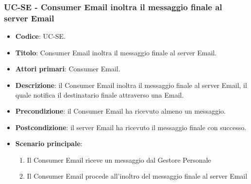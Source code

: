 \subsubsection{UC\theuccount-SE - Consumer Email inoltra il messaggio finale al server Email}
	\begin{itemize}
		\item \textbf{Codice}: UC\theuccount-SE.
		\item \textbf{Titolo}: Consumer Email inoltra il messaggio finale al server Email.
		\item \textbf{Attori primari}: Consumer Email.
		\item \textbf{Descrizione}: il Consumer Email inoltra il messaggio finale al server Email, il quale notifica il destinatario finale attraverso una Email.
		\item \textbf{Precondizione}: il Consumer Email ha ricevuto almeno un messaggio.
		\item \textbf{Postcondizione}: il server Email ha ricevuto il messaggio finale con successo.
		\item \textbf{Scenario principale}: 
		\begin{enumerate}
			\item Il Consumer Email riceve un messaggio dal Gestore Personale
			\item Il Consumer Email procede all'inoltro del messaggio finale al server Email
		\end{enumerate}
		
	\end{itemize}